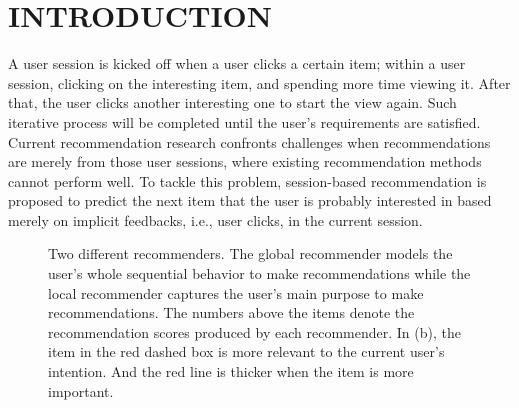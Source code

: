 \documentclass[sigconf]{acmart}
\begin{document}

\maketitle

\section{INTRODUCTION}

A user session is kicked off when a user clicks a certain item; within a user session,  
clicking on the interesting item, and spending more time viewing it. After that, the user clicks another interesting one to start the view again. Such iterative process will be completed until the user's requirements are satisfied. 
Current recommendation research confronts challenges when recommendations are merely from those user sessions, where existing recommendation methods \cite{koren2009matrix,adomavicius2005toward,weimer2007maximum,su2009survey} cannot perform well. To tackle this problem, session-based recommendation \cite{schafer1999recommender} is proposed to predict the next item that the user is probably interested in based merely on implicit feedbacks, i.e., user clicks, in the current session.

    \begin{figure}
    	\centering
    	\vspace{1em}
    	\hspace{4em} 
    	\caption{Two different recommenders. The global recommender models the user's whole sequential behavior to make recommendations while the local recommender captures the user's main purpose to make recommendations. The numbers above the items denote the recommendation scores produced by each recommender. In (b), the item in the red dashed box is more relevant to the current user's intention. And the red line is thicker when the item is more important.}
    \end{figure}
\end{document}
